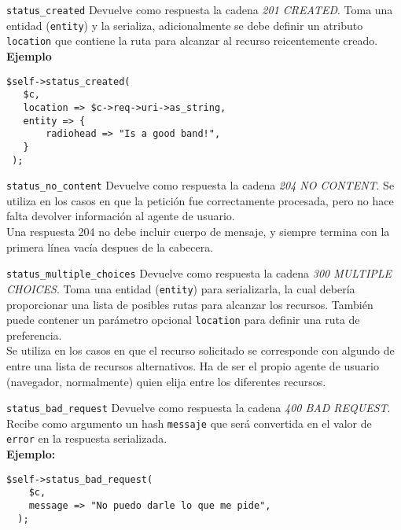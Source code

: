 \begin{frame}[fragile]{\texttt{status\_created}} %
    Devuelve como respuesta la cadena \textit{201 CREATED}. Toma una entidad
    (\texttt{entity}) y la serializa, adicionalmente se debe definir un
    atributo \texttt{location} que contiene la ruta para alcanzar al recurso
    reicentemente creado. \\[0.5cm]

    \textbf{Ejemplo}
    \begin{lstlisting}
$self->status_created(
   $c,
   location => $c->req->uri->as_string,
   entity => {
       radiohead => "Is a good band!",
   }
 );
    \end{lstlisting}

\end{frame}

\begin{frame}[fragile]{\texttt{status\_no\_content}} %
    Devuelve como respuesta la cadena \textit{204 NO CONTENT}. Se utiliza en
    los casos en que la petición fue correctamente procesada, pero no hace
    falta devolver información al agente de usuario. \\[0.5cm]

    Una respuesta 204 no debe incluir cuerpo de mensaje, y siempre termina con
    la primera línea vacía despues de la cabecera.
\end{frame}

\begin{frame}[fragile]{\texttt{status\_multiple\_choices}} %
    Devuelve como respuesta la cadena \textit{300 MULTIPLE CHOICES}. Toma una
    entidad (\texttt{entity}) para serializarla, la cual debería proporcionar
    una lista de posibles rutas para alcanzar los recursos. También puede
    contener un parámetro opcional \texttt{location} para definir una ruta de
    preferencia. \\[0.5cm]

    Se utiliza en los casos en que el recurso solicitado se corresponde con
    algundo de entre una lista de recursos alternativos. Ha de ser el propio
    agente de usuario (navegador, normalmente) quien elija entre los diferentes
    recursos.  
\end{frame}

\begin{frame}[fragile]{\texttt{status\_bad\_request}} %
    Devuelve como respuesta la cadena \textit{400 BAD REQUEST}. Recibe como
    argumento un hash \texttt{messaje} que será convertida en el valor de \texttt{error} en
    la respuesta serializada. \\[0.5cm]

    \textbf{Ejemplo:}
    \begin{lstlisting}
$self->status_bad_request(
    $c,
    message => "No puedo darle lo que me pide",
  );
    \end{lstlisting}
\end{frame}

